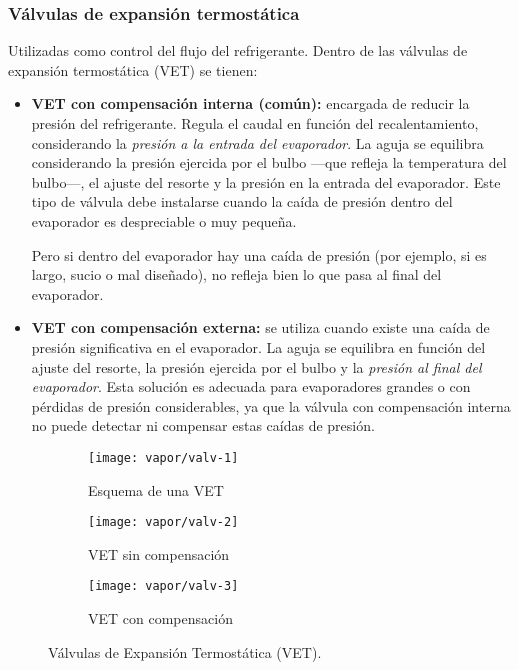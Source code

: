 \subsubsection{Válvulas de expansión termostática}
Utilizadas como control del flujo del refrigerante.
Dentro de las válvulas de expansión termostática (VET) se tienen:
\begin{itemize}
    \item \textbf{VET con compensación interna (común):} encargada de reducir la presión del refrigerante. Regula el caudal en función del recalentamiento, considerando la \emph{presión a la entrada del evaporador}. La aguja se equilibra considerando la presión ejercida por el bulbo —que refleja la temperatura del bulbo—, el ajuste del resorte y la presión en la entrada del evaporador. Este tipo de válvula debe instalarse cuando la caída de presión dentro del evaporador es despreciable o muy pequeña.

    Pero si dentro del evaporador hay una caída de presión (por ejemplo, si es largo, sucio o mal diseñado), no refleja bien lo que pasa al final del evaporador.
    
    \item \textbf{VET con compensación externa:} se utiliza cuando existe una caída de presión significativa en el evaporador. La aguja se equilibra en función del ajuste del resorte, la presión ejercida por el bulbo y la \emph{presión al final del evaporador}. Esta solución es adecuada para evaporadores grandes o con pérdidas de presión considerables, ya que la válvula con compensación interna no puede detectar ni compensar estas caídas de presión. 
\end{itemize}

\begin{figure}[h]
  \centering
  \begin{subfigure}{.4\linewidth}
      \texttt{[image: vapor/valv-1]}
      \caption{Esquema de una VET}
  \end{subfigure}
  \begin{subfigure}{.25\linewidth}
      \texttt{[image: vapor/valv-2]}
      \caption{VET sin compensación}
  \end{subfigure}
  \begin{subfigure}{.25\linewidth}
      \texttt{[image: vapor/valv-3]}
      \caption{VET con compensación}
  \end{subfigure}
  \caption{Válvulas de Expansión Termostática (VET).}
   \label{fig:tres_imagenes}
\end{figure}

